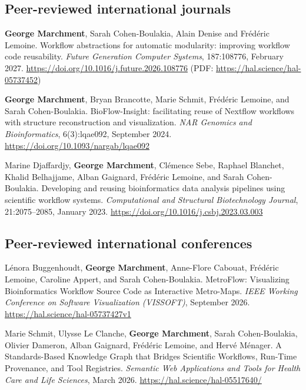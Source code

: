 \documentclass[10pt,a4paper]{article}
\begin{document}
\subsection*{Peer-reviewed international journals}
\begin{publist}[label={[J\arabic*]}]
  \item \textbf{George Marchment}, Sarah Cohen-Boulakia, Alain Denise and Frédéric Lemoine. Workflow abstractions for automatic modularity: improving workflow code reusability. \emph{Future Generation Computer Systems}, 187:108776, February 2027. \url{https://doi.org/10.1016/j.future.2026.108776} (PDF: \url{https://hal.science/hal-05737452})
  \item \textbf{George Marchment}, Bryan Brancotte, Marie Schmit, Frédéric Lemoine, and Sarah Cohen-Boulakia. BioFlow-Insight: facilitating reuse of Nextflow workflows with structure reconstruction and visualization. \emph{NAR Genomics and Bioinformatics}, 6(3):lqae092, September 2024. \url{https://doi.org/10.1093/nargab/lqae092}
  \item Marine Djaffardjy, \textbf{George Marchment}, Clémence Sebe, Raphael Blanchet, Khalid Belhajjame, Alban Gaignard, Frédéric Lemoine, and Sarah Cohen-Boulakia. Developing and reusing bioinformatics data analysis pipelines using scientific workflow systems. \emph{Computational and Structural Biotechnology Journal}, 21:2075--2085, January 2023. \url{https://doi.org/10.1016/j.csbj.2023.03.003}
\end{publist}

\subsection*{Peer-reviewed international conferences}
\begin{publist}[label={[C\arabic*]}]
  \item Lénora Buggenhoudt, \textbf{George Marchment}, Anne-Flore Cabouat, Frédéric Lemoine, Caroline Appert, and Sarah Cohen-Boulakia. MetroFlow: Visualizing Bioinformatics Workflow Source Code as Interactive Metro-Maps. \emph{IEEE Working Conference on Software Visualization (VISSOFT)}, September 2026. \url{https://hal.science/hal-05737427v1}
  \item Marie Schmit, Ulysse Le Clanche, \textbf{George Marchment}, Sarah Cohen-Boulakia, Olivier Dameron, Alban Gaignard, Frédéric Lemoine, and Hervé Ménager. A Standards-Based Knowledge Graph that Bridges Scientific Workflows, Run-Time Provenance, and Tool Registries. \emph{Semantic Web Applications and Tools for Health Care and Life Sciences}, March 2026. \url{https://hal.science/hal-05517640/}
\end{publist}
\end{document}
